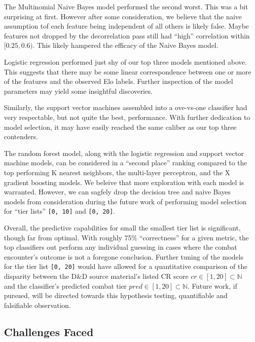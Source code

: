 \documentclass[12pt]{diazessay}
\begin{document}
The Multinomial Naive Bayes model performed the second worst.
This was a bit surprising at first.
However after some consideration, we believe that the naive assumption tof each feature being independent of all others is likely false.
Maybe features not dropped by the decorrelation pass still had ``high'' correlation within $[0.25, 0.6)$.
This likely hampered the efficacy of the Naive Bayes model.


Logistic regression performed just shy of our top three models mentioned above.
This suggests that there may be some linear correspondence between one or more of the features and the observed Elo labels.
Further inspection of the model parameters may yield some insightful discoveries.

Similarly, the support vector machines assembled into a ove-vs-one classifier had very respectable, but not quite the best, performance.
With further dedication to model selection, it may have easily reached the same caliber as our top three contenders.

The random forest model, along with the logistic regression and support vector machine models, can be considered in a ``second place'' ranking compared to the top performing  K nearest neighbors, the multi-layer perceptron, and the X gradient boosting models.
We beleive that more exploration with each model is warranted.
However, we can sagfely drop the decision tree and naive Bayes models from consideration during the future work of performing model selection for ``tier lists'' \texttt{[0, 10]} and \texttt{[0, 20]}.

Overall, the predictive capabilities for small the smallest tier list is significant, though far from optimal.
With roughly 75\% ``correctness'' for a given metric, the top classifiers out perform any individual guessing in cases where the combat encounter's outcome is not a foregone conclusion. 
Further tuning of the models for the tier list \texttt{[0, 20]} would have allowed for a quantitative comparison of the disparity between the D\&D source material's listed CR score $cr \in [1, 20] \subset \mathbb{N}$ and the classifier's predicted combat tier $pred \in [1, 20] \subset \mathbb{N}$.
Future work, if pursued, will be directed towards this hypothesis testing, quantifiable and falsifiable observation.

\subsection{Challenges Faced}
\label{sec:challenges}
\end{document}
